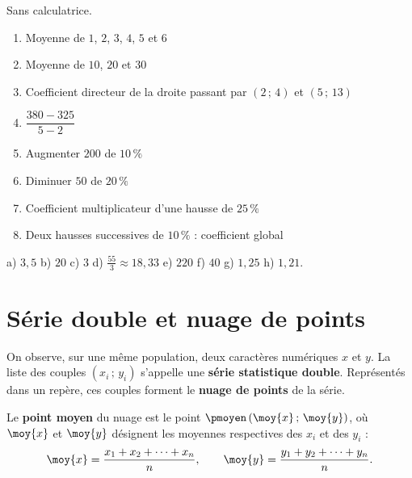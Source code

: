 \begin{automatismes}
Sans calculatrice.

\begin{enumerate}[label=\textbf{\alph*)}, leftmargin=*, itemsep=0.25em]
  \item Moyenne de $1$, $2$, $3$, $4$, $5$ et $6$
  \item Moyenne de $10$, $20$ et $30$
  \item Coefficient directeur de la droite passant par $(2\,;\,4)$ et
        $(5\,;\,13)$
  \item $\dfrac{380-325}{5-2}$
  \item Augmenter $200$ de $10\,\%$
  \item Diminuer $50$ de $20\,\%$
  \item Coefficient multiplicateur d'une hausse de $25\,\%$
  \item Deux hausses successives de $10\,\%$ : coefficient global
\end{enumerate}
\end{automatismes}

\begin{corrige}[automatismes]
a) $3{,}5$ \quad b) $20$ \quad c) $3$ \quad d) $\frac{55}{3} \approx 18{,}33$
\quad e) $220$ \quad f) $40$ \quad g) $1{,}25$ \quad h) $1{,}21$.
\end{corrige}

\section{Série double et nuage de points}

\begin{definition}
On observe, sur une même population, deux caractères numériques $x$ et $y$.
La liste des couples $\left(x_{i}\,;\,y_{i}\right)$ s'appelle une
\textbf{série statistique double}. Représentés dans un repère, ces couples
forment le \textbf{nuage de points} de la série.
\end{definition}

\begin{definition}
Le \textbf{point moyen} du nuage est le point
$\pmoyen\left(\moy{x}\,;\,\moy{y}\right)$, où $\moy{x}$ et $\moy{y}$
désignent les moyennes respectives des $x_{i}$ et des $y_{i}$ :
\[
  \moy{x} = \frac{x_{1}+x_{2}+\cdots+x_{n}}{n}, \qquad
  \moy{y} = \frac{y_{1}+y_{2}+\cdots+y_{n}}{n}.
\]
\end{definition}

